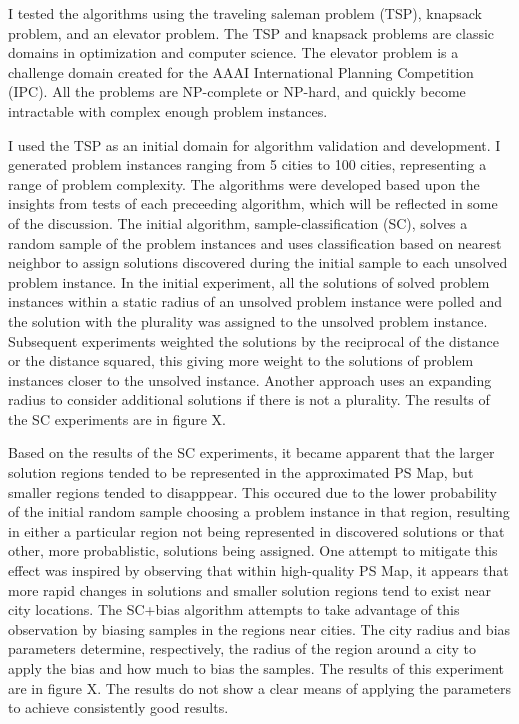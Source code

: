 \documentclass[12pt]{report}
\begin{document}
I tested the algorithms using the traveling saleman problem (TSP), knapsack problem, and an elevator problem.  The TSP and knapsack problems are classic domains in optimization and computer science.  The elevator problem is a challenge domain created for the AAAI International Planning Competition (IPC).  All the problems are NP-complete or NP-hard, and quickly become intractable with complex enough problem instances.


I used the TSP as an initial domain for algorithm validation and development.  I generated problem instances ranging from 5 cities to 100 cities, representing a range of problem complexity.  The algorithms were developed based upon the insights from tests of  each preceeding algorithm, which will be reflected in some of the discussion.  The initial algorithm, sample-classification (SC), solves a random sample of the problem instances and uses classification based on nearest neighbor to assign solutions discovered during the initial sample to each unsolved problem instance.  In the initial experiment, all the solutions of solved problem instances within a static radius of an unsolved problem instance  were polled and the solution with the plurality was assigned to the unsolved problem instance.  Subsequent experiments weighted the solutions by the reciprocal of the distance or the distance squared, this giving more weight to the solutions of problem instances closer to  the unsolved instance.  Another approach uses an expanding radius to consider additional solutions if there is not a plurality.  The results of the SC experiments are in figure X.  

Based on the results of the SC experiments, it became apparent that the larger solution regions tended to be represented in the approximated PS Map, but smaller regions tended to disapppear.  This occured due to the lower probability of the initial random sample choosing a problem instance in that region, resulting in either a particular region not being represented in discovered solutions or that other, more probablistic, solutions being assigned.  One attempt to mitigate this effect was inspired by observing that within high-quality PS Map, it appears that more rapid changes in solutions and smaller solution regions tend to exist near city locations.  The SC+bias algorithm attempts to take advantage of this observation by biasing samples in the regions near cities.  The city radius and bias parameters determine, respectively, the radius of the region around a city to apply the bias and how much to bias the samples.  The results of this experiment are in figure X.  The results do not show a clear means of applying the parameters to achieve consistently good results.
\end{document}
